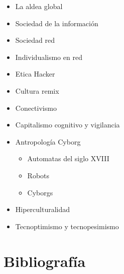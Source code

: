 \documentclass[]{book}
\providecommand{\tightlist}{%
  \setlength{\itemsep}{0pt}\setlength{\parskip}{0pt}}
\begin{document}
\begin{itemize}
\tightlist
\item
  La aldea global
\item
  Sociedad de la información
\item
  Sociedad red
\item
  Individualismo en red
\item
  Etica Hacker
\item
  Cultura remix
\item
  Conectivismo
\item
  Capitalismo cognitivo y vigilancia
\item
  Antropología Cyborg

  \begin{itemize}
  \tightlist
  \item
    Automatas del siglo XVIII
  \item
    Robots
  \item
    Cyborgs
  \end{itemize}
\item
  Hiperculturalidad
\item
  Tecnoptimismo y tecnopesimismo
\end{itemize}

\hypertarget{bibliografuxeda-1}{%
\section*{Bibliografía}\label{bibliografuxeda-1}}
\end{document}
